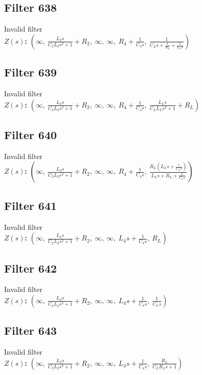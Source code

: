 \documentclass{article}
\begin{document}
\subsection*{Filter 638}
Invalid filter \\ 
\textbf{$Z(s)$:} $\left( \infty, \  \frac{L_{2} s}{C_{2} L_{2} s^{2} + 1} + R_{2}, \  \infty, \  \infty, \  R_{4} + \frac{1}{C_{4} s}, \  \frac{1}{C_{L} s + \frac{1}{R_{L}} + \frac{1}{L_{L} s}}\right)$ \\ 
\subsection*{Filter 639}
Invalid filter \\ 
\textbf{$Z(s)$:} $\left( \infty, \  \frac{L_{2} s}{C_{2} L_{2} s^{2} + 1} + R_{2}, \  \infty, \  \infty, \  R_{4} + \frac{1}{C_{4} s}, \  \frac{L_{L} s}{C_{L} L_{L} s^{2} + 1} + R_{L}\right)$ \\ 
\subsection*{Filter 640}
Invalid filter \\ 
\textbf{$Z(s)$:} $\left( \infty, \  \frac{L_{2} s}{C_{2} L_{2} s^{2} + 1} + R_{2}, \  \infty, \  \infty, \  R_{4} + \frac{1}{C_{4} s}, \  \frac{R_{L} \left(L_{L} s + \frac{1}{C_{L} s}\right)}{L_{L} s + R_{L} + \frac{1}{C_{L} s}}\right)$ \\ 
\subsection*{Filter 641}
Invalid filter \\ 
\textbf{$Z(s)$:} $\left( \infty, \  \frac{L_{2} s}{C_{2} L_{2} s^{2} + 1} + R_{2}, \  \infty, \  \infty, \  L_{4} s + \frac{1}{C_{4} s}, \  R_{L}\right)$ \\ 
\subsection*{Filter 642}
Invalid filter \\ 
\textbf{$Z(s)$:} $\left( \infty, \  \frac{L_{2} s}{C_{2} L_{2} s^{2} + 1} + R_{2}, \  \infty, \  \infty, \  L_{4} s + \frac{1}{C_{4} s}, \  \frac{1}{C_{L} s}\right)$ \\ 
\subsection*{Filter 643}
Invalid filter \\ 
\textbf{$Z(s)$:} $\left( \infty, \  \frac{L_{2} s}{C_{2} L_{2} s^{2} + 1} + R_{2}, \  \infty, \  \infty, \  L_{4} s + \frac{1}{C_{4} s}, \  \frac{R_{L}}{C_{L} R_{L} s + 1}\right)$ \\ 
\end{document}
